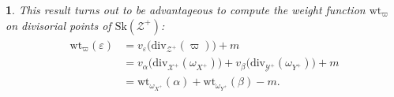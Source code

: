 \documentclass{amsart}%
\numberwithin{equation}{subsection}
\theoremstyle{plain2}
\theoremstyle{definition2}
\theoremstyle{stepstyle}
\theoremstyle{point}
\theoremstyle{subpoint}
\newtheorem{subpoint}[equation]{}%
\newcommand{\spa}[1]{\begin{subpoint}#1\end{subpoint}}           %
\newcommand{\R}{\ensuremath{\mathbb{R}}}
\newcommand{\cX}{\ensuremath{\mathscr{X}}}
\newcommand{\cY}{\ensuremath{\mathscr{Y}}}
\newcommand{\cZ}{\ensuremath{\mathscr{Z}}}
\renewcommand{\R}{\ensuremath{\mathbb{R}}}
\renewcommand{\cZ}{\ensuremath{\mathscr{Z}}}
\renewcommand{\cY}{\ensuremath{\mathscr{Y}}}
\newcommand{\divisor}{\mathrm{div}}
\newcommand{\weight}{\mathrm{wt}}
\newcommand{\Sk}{\mathrm{Sk}}
\begin{document}
{%
%
%
%
%
%
}
\spa{This result turns out to be advantageous to compute the weight function $\weight_\varpi$ on divisorial points of $\Sk(\cZ^+)$: 
\begin{align} \label{equ weight function product}
\begin{split}
\weight_\varpi(\varepsilon)
& = v_{\varepsilon}\big(\divisor_{\cZ^+}(\varpi)\big) +m \\
& = v_{\alpha}\big(\divisor_{\cX^+}(\omega_{X^+})\big) + v_{\beta}\big(\divisor_{\cY^+}(\omega_{Y^+})\big) + m \\
& = \weight_{\omega_{X^+}}(\alpha) + \weight_{\omega_{Y^+}}(\beta) - m.
\end{split}
\end{align}
}
\end{document}
